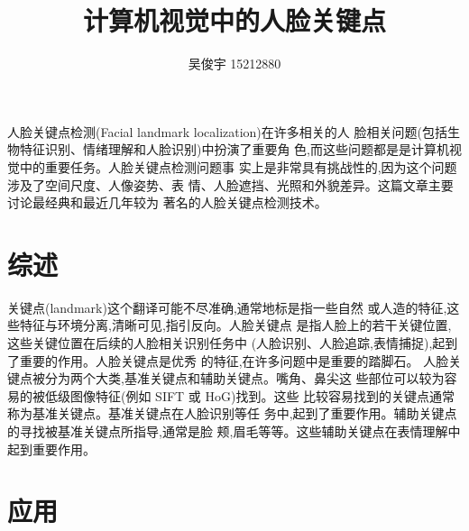 \documentclass{ctexart}
\title{计算机视觉中的人脸关键点}
\author{吴俊宇 15212880}
\begin{document}
\maketitle

人脸关键点检测(Facial landmark localization)在许多相关的人
脸相关问题(包括生物特征识别、情绪理解和人脸识别)中扮演了重要角
色,而这些问题都是是计算机视觉中的重要任务。人脸关键点检测问题事
实上是非常具有挑战性的,因为这个问题涉及了空间尺度、人像姿势、表
情、人脸遮挡、光照和外貌差异。这篇文章主要讨论最经典和最近几年较为
著名的人脸关键点检测技术。

\section{综述}

关键点(landmark)这个翻译可能不尽准确,通常地标是指一些自然
或人造的特征,这些特征与环境分离,清晰可见,指引反向。人脸关键点
是指人脸上的若干关键位置,这些关键位置在后续的人脸相关识别任务中
(人脸识别、人脸追踪,表情捕捉),起到了重要的作用。人脸关键点是优秀
的特征,在许多问题中是重要的踏脚石。
人脸关键点被分为两个大类,基准关键点和辅助关键点。嘴角、鼻尖这
些部位可以较为容易的被低级图像特征(例如 SIFT 或 HoG)找到。这些
比较容易找到的关键点通常称为基准关键点。基准关键点在人脸识别等任
务中,起到了重要作用。辅助关键点的寻找被基准关键点所指导,通常是脸
颊,眉毛等等。这些辅助关键点在表情理解中起到重要作用。

\section{应用}
\end{document}
